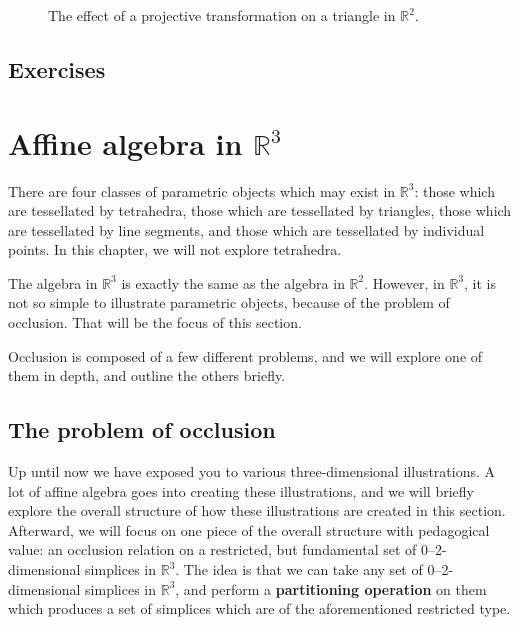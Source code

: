 \begin{figure}
    \caption{The effect of a projective transformation on a triangle in \(\mathbb{R}^{2}\).}
    \label{fig:affine-R2projectivetransformation}
\end{figure}

\subsection*{Exercises}

\section{Affine algebra in \texorpdfstring{\(\mathbb{R}^{3}\)}{R3}}

There are four classes of parametric objects which may exist in 
\(\mathbb{R}^{3}\): those which are tessellated by tetrahedra, those 
which are tessellated by triangles, those which are tessellated by
line segments, and those which are tessellated by individual points.
In this chapter, we will not explore tetrahedra.

The algebra in \(\mathbb{R}^{3}\) is exactly the same as the 
algebra in \(\mathbb{R}^{2}\). However, in \(\mathbb{R}^{3}\), 
it is not so simple to illustrate parametric objects, because of the
problem of occlusion. That will be the focus of this section.

Occlusion is composed of a few different problems, and we will
explore one of them in depth, and outline the others briefly. 

\subsection{The problem of occlusion}

Up until now we have exposed you to various three-dimensional 
illustrations. A lot of affine algebra goes into creating these
illustrations, and we will briefly explore the overall structure of 
how these illustrations are created in this section. Afterward, we 
will focus on one piece of the overall structure with pedagogical
value: an occlusion relation on a restricted, but fundamental 
set of 0--2-dimensional simplices in \(\mathbb{R}^{3}\). The idea 
is that we can take any set of 0--2-dimensional simplices in
\(\mathbb{R}^{3}\), and perform a \textbf{partitioning operation} on them which 
produces a set of simplices which are of the aforementioned restricted type.


